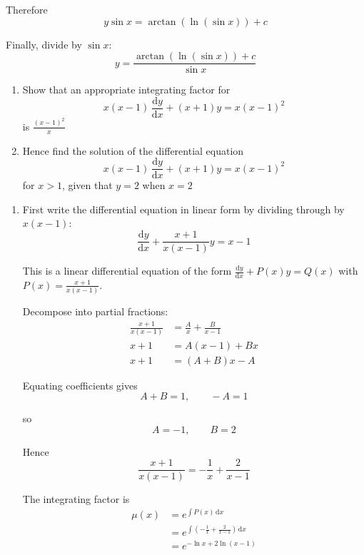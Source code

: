 \documentclass[leqno]{article}
\begin{document}
\begin{enumerate}[
  label=\textbf{\arabic*.},
  leftmargin=*,
  topsep=0pt,
  partopsep=0pt,
  parsep=0pt
]
\begin{djsSolution}
Therefore
\[
y\sin x=\arctan(\ln(\sin x))+c
\]

Finally, divide by $\sin x$:
\[
y=\frac{\arctan(\ln(\sin x))+c}{\sin x}
\]
\end{djsSolution}


\newpage

\questionitem

\begin{enumerate}[label=\textbf{(\alph*)}]
  \item Show that an appropriate integrating factor for
  \[
  x(x-1)\,\frac{\mathrm{d}y}{\mathrm{d}x}+(x+1)y=x(x-1)^2
  \]
  is $\frac{(x-1)^2}{x}$  \\
  \item Hence find the solution of the differential equation
  \[
  x(x-1)\,\frac{\mathrm{d}y}{\mathrm{d}x}+(x+1)y=x(x-1)^2
  \]
  for $x>1$, given that $y=2$ when $x=2$  \\
\end{enumerate}

\vspace*{10pt}

\begin{djsSolution}
\begin{enumerate}[label=\textbf{(\alph*)}]
  \item First write the differential equation in linear form by dividing through by $x(x-1)$:
\[
\frac{\mathrm{d}y}{\mathrm{d}x}+\frac{x+1}{x(x-1)}y=x-1
\]

This is a linear differential equation of the form \(\frac{\mathrm{d}y}{\mathrm{d}x}+P(x)y=Q(x)\) with \(P(x)=\frac{x+1}{x(x-1)}\).

Decompose into partial fractions:
\begin{align*}
\frac{x+1}{x(x-1)}&=\frac{A}{x}+\frac{B}{x-1} \\
x+1&=A(x-1)+Bx \\
x+1&=(A+B)x-A
\end{align*}

Equating coefficients gives
\[
A+B=1,\qquad -A=1
\]

so
\[
A=-1,\qquad B=2
\]

Hence
\[
\frac{x+1}{x(x-1)}=-\frac{1}{x}+\frac{2}{x-1}
\]

The integrating factor is
\begin{align*}
\mu(x)&=e^{\int P(x)\,\mathrm{d}x} \\
&=e^{\int\left(-\frac{1}{x}+\frac{2}{x-1}\right)\,\mathrm{d}x} \\
&=e^{-\ln x+2\ln(x-1)}
\end{align*}


\end{enumerate}
\end{djsSolution}
\end{enumerate}
\end{document}
